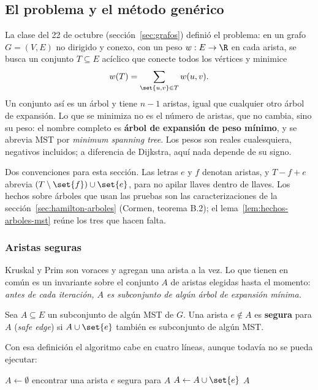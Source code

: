 \documentclass[11pt,letterpaper]{article}
\begin{document}
\subsection*{El problema y el método genérico}

La clase del 22 de octubre (sección~\ref{sec:grafos}) definió el
problema: en un grafo $G = (V, E)$ no dirigido y conexo, con un peso
$w : E \to \R$ en cada arista, se busca un conjunto $T \subseteq E$
acíclico que conecte todos los vértices y minimice
\[
  w(T) = \sum_{\set{u, v} \in T} w(u, v) .
\]
Un conjunto así es un árbol y tiene $n - 1$ aristas, igual que
cualquier otro árbol de expansión. Lo que se minimiza no es el número
de aristas, que no cambia, sino su peso: el nombre completo es
\textbf{árbol de expansión de peso mínimo}, y se abrevia MST por
\textit{minimum spanning tree}. Los pesos son reales cualesquiera,
negativos incluidos; a diferencia de Dijkstra, aquí nada depende de su
signo.

Dos convenciones para esta sección. Las letras $e$ y $f$ denotan
aristas, y $T - f + e$ abrevia $(T \setminus \set{f}) \cup \set{e}$,
para no apilar llaves dentro de llaves. Los hechos sobre árboles que
usan las pruebas son las caracterizaciones de la
sección~\ref{sec:hamilton-arboles} (Cormen, teorema B.2); el
lema~\ref{lem:hechos-arboles-mst} reúne los tres que hacen falta.

\subsubsection*{Aristas seguras}

Kruskal y Prim son voraces y agregan una arista a la vez. Lo que
tienen en común es un invariante sobre el conjunto $A$ de aristas
elegidas hasta el momento: \emph{antes de cada iteración, $A$ es
subconjunto de algún árbol de expansión mínima.}

\begin{definicion}
  \label{def:arista-segura-mst}
  Sea $A \subseteq E$ un subconjunto de algún MST de $G$. Una arista
  $e \notin A$ es \textbf{segura} para $A$ (\textit{safe edge}) si
  $A \cup \set{e}$ también es subconjunto de algún MST.
\end{definicion}

Con esa definición el algoritmo cabe en cuatro líneas, aunque todavía
no se pueda ejecutar:

\begin{algorithm}[H]
\caption{\textsc{MST-Genérico}$(G, w)$}
\label{alg:mst-generico}
\begin{algorithmic}[1]
  \State $A \gets \emptyset$
    \State encontrar una arista $e$ segura para $A$
    \State $A \gets A \cup \set{e}$
  \EndWhile
  \State \Return $A$
\EndProcedure
\end{algorithmic}
\end{algorithm}
\end{document}
